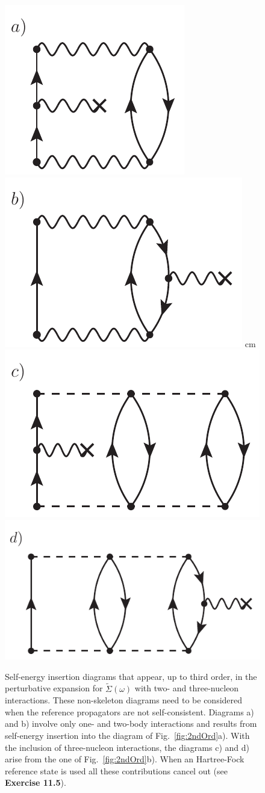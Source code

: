 \begin{figure}[t]
\begin{center}
\includegraphics[height=0.22\textwidth]{Chapter11-figures/fig11_5_a.pdf}   \hspace{0.25\textwidth}
\includegraphics[height=0.22\textwidth]{Chapter11-figures/fig11_5_b.pdf}   \hspace{0.20\textwidth}
 cm
\includegraphics[height=0.21\textwidth]{Chapter11-figures/fig11_5_c.pdf}   \hspace{0.1\textwidth}
\includegraphics[height=0.21\textwidth]{Chapter11-figures/fig11_5_d.pdf}
\caption{Self-energy insertion diagrams that appear, up to third order, in the perturbative expansion for $\widetilde\Sigma(\omega)$ with two- and three-nucleon interactions. These non-skeleton diagrams need to be considered  when the reference propagators are not self-consistent.  Diagrams a) and b) involve only one- and two-body interactions and results from self-energy insertion into the diagram of Fig.~\ref{fig:2ndOrd}a).  With the inclusion of three-nucleon interactions, the diagrams c) and d) arise from the one of Fig.~\ref{fig:2ndOrd}b).  When an Hartree-Fock reference state is used all these contributions cancel out (see {\bf Exercise 11.5}). }
\label{fig:SEins_3ndOrd}
\end{center}
\end{figure}

